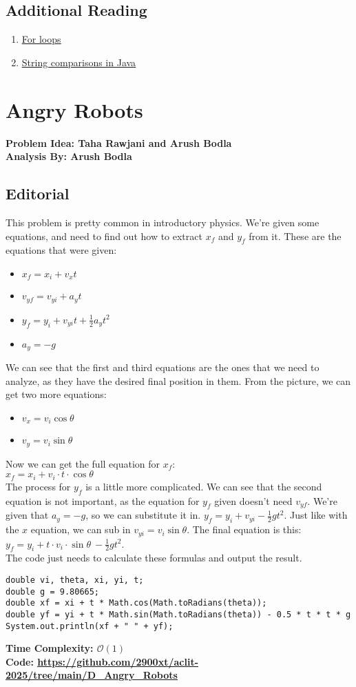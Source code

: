 \documentclass{article}
\newcommand{\link}[1]{\textcolor{blue!50!black}{\uline{\url{#1}}}}
\newcommand{\namelink}[2]{\textcolor{blue!50!black}{\uline{\href{#1}{#2}}}}
\begin{document}
\subsection{Additional Reading}
\begin{enumerate}
    \item \namelink{https://www.geeksforgeeks.org/java-for-loop-with-examples/}{For loops}
    \item \namelink{https://www.geeksforgeeks.org/compare-two-strings-in-java/}{String comparisons in Java}
\end{enumerate}
\newpage
\section{Angry Robots}
\textbf{Problem Idea: Taha Rawjani and Arush Bodla\\Analysis By: Arush Bodla}
\subsection{Editorial}
This problem is pretty common in introductory physics. We're given some equations, and need to find out how to extract $x_f$ and $y_f$ from it. These are the equations that were given:
\begin{itemize}
	\item $x_f = x_i+ v_xt$
	\item $v_{yf} = v_{yi} + a_yt$
	\item $y_f = y_i + v_{yi}t + \frac{1}{2}a_yt^2$
	\item $a_y = -g$
\end{itemize}
We can see that the first and third equations are the ones that we need to analyze, as they have the desired final position in them. From the picture, we can get two more equations:
\begin{itemize}
	\item $v_x=v_i\cos \theta$
	\item $v_y = v_i\sin \theta$
\end{itemize}
Now we can get the full equation for $x_f$:\\
$x_f = x_i+v_i\cdot t\cdot\cos \theta $\\
The process for $y_f$ is a little more complicated. We can see that the second equation is not important, as the equation for $y_f$ given doesn't need $v_{yf}$. We're given that $a_y=-g$, so we can substitute it in.
$y_f=y_i+v_{yi}-\frac{1}{2}gt^2$.
Just like with the $x$ equation, we can sub in $v_{yi}=v_i\sin \theta$.
The final equation is this:\\
$y_f=y_i+t\cdot v_i\cdot\sin\theta\ - \frac{1}{2}gt^2$.\\
The code just needs to calculate these formulas and output the result.
\begin{lstlisting}
double vi, theta, xi, yi, t;
double g = 9.80665;
double xf = xi + t * Math.cos(Math.toRadians(theta));
double yf = yi + t * Math.sin(Math.toRadians(theta)) - 0.5 * t * t * g
System.out.println(xf + " " + yf);
\end{lstlisting}
\textbf{Time Complexity: $\mathcal{O}(1)$}\\
\textbf{Code: \link{https://github.com/2900xt/aclit-2025/tree/main/D_Angry_Robots}}
\end{document}
